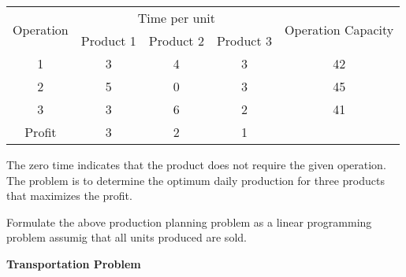 \documentclass[11pt, a4paper]{article}
\begin{document}
\begin{enumerate}
	\begin{table}[h]
	\def\arraystretch{1.5}
	
	\begin{center}
	\begin{tabular}{|c|c|c|c|c|}
	
	\hline
	
	\multirow{2}{*}{Operation} & \multicolumn{3}{c|}{Time per unit} & \multirow{2}{*}{Operation Capacity} \\
	
	\hhline{~---~}
	
	& Product 1 & Product 2 & Product 3 & \\
	
	\hline
	
	1 & 3 & 4 & 3 & 42 \\
	
	2 & 5 & 0 & 3 & 45 \\
	
	3 & 3 & 6 & 2 & 41 \\
	
	\hline
	
	Profit & 3 & 2 & 1 & \\
	
	\hline
	
	\end{tabular}
	\end{center}
	
	\end{table}
	
	The zero time indicates that the product does not require the given operation. The problem is to determine the optimum daily production for three products that maximizes the profit.
	
	
	Formulate the above production planning problem as a linear programming problem assumig that all units produced are sold.
	
	
	
	
	
	
	
	
	
	
	
	
	
	
	
	
\newpage

\begin{center}
\textbf{\huge Transportation Problem}
\end{center}


	
\vspace{50pt}
	

\end{enumerate}
\end{document}
